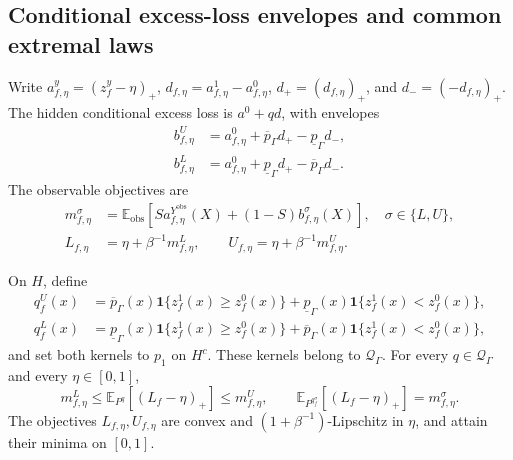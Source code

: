 \subsection{Conditional excess-loss envelopes and common extremal laws}
\label{app:extremal}

Write $a^y_{f,\eta}=(z_f^y-\eta)_+$, $d_{f,\eta}=a^1_{f,\eta}-a^0_{f,\eta}$, $d_+=(d_{f,\eta})_+$, and $d_-=(-d_{f,\eta})_+$. The hidden conditional excess loss is $a^0+qd$, with envelopes
\begin{equation}
\begin{split}
b^U_{f,\eta}&=a^0_{f,\eta}+\overline p_\Gamma d_+-\underline p_\Gamma d_-,\\
b^L_{f,\eta}&=a^0_{f,\eta}+\underline p_\Gamma d_+-\overline p_\Gamma d_-.
\end{split}
\label{eq:a:conditional-envelopes}
\end{equation}
The observable objectives are
\begin{equation}
\begin{split}
m^\sigma_{f,\eta}&=\mathbb E_{\mathrm{obs}}[S a^{Y^{\mathrm{obs}}}_{f,\eta}(X)+(1-S)b^\sigma_{f,\eta}(X)],\quad\sigma\in\{L,U\},\\
L_{f,\eta}&=\eta+\beta^{-1}m^L_{f,\eta},\qquad U_{f,\eta}=\eta+\beta^{-1}m^U_{f,\eta}.
\end{split}
\label{eq:a:population-objectives}
\end{equation}

\begin{lemma}
\label{lemma:a:common-extrema}\label{lemma:a:threshold-regularity}
On $H$, define
\begin{equation}
\begin{split}
q_f^U(x)&=\overline p_\Gamma(x)\mathbf{1}\{z_f^1(x)\geq z_f^0(x)\}
 +\underline p_\Gamma(x)\mathbf{1}\{z_f^1(x)<z_f^0(x)\},\\
q_f^L(x)&=\underline p_\Gamma(x)\mathbf{1}\{z_f^1(x)\geq z_f^0(x)\}
 +\overline p_\Gamma(x)\mathbf{1}\{z_f^1(x)<z_f^0(x)\},
\end{split}
\label{eq:a:common-kernels}
\end{equation}
and set both kernels to $p_1$ on $H^c$. These kernels belong to $\mathcal Q_\Gamma$. For every $q\in\mathcal Q_\Gamma$ and every $\eta\in[0,1]$,
\begin{equation}
m^L_{f,\eta}
\leq\mathbb E_{P^q}[(L_f-\eta)_+]
\leq m^U_{f,\eta},
\qquad
\mathbb E_{P^{q_f^\sigma}}[(L_f-\eta)_+]=m^\sigma_{f,\eta}.
\label{eq:a:simultaneous-attainment}
\end{equation}
The objectives $L_{f,\eta},U_{f,\eta}$ are convex and $(1+\beta^{-1})$-Lipschitz in $\eta$, and attain their minima on $[0,1]$.
\end{lemma}

